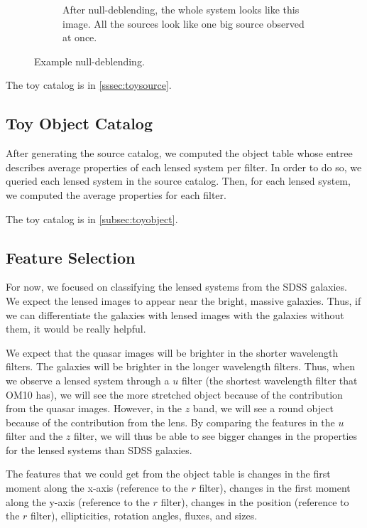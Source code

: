 \documentclass[\docopts]{\docclass}
\begin{document}
\begin{figure}
\begin{subfigure}[bt]{0.48\linewidth}
        \caption{After null-deblending, the whole system looks like this image. All the sources look like one big source observed at once.                                                                                                                                                                                 }
    \end{subfigure}
    \caption{Example null-deblending.}
    \label{fig:null-deblend}
\end{figure}

The toy catalog is in \ref{sssec:toysource}.

\subsection{Toy Object Catalog}
\label{sssec:toyobject}

After generating the source catalog, we computed the object table whose entree describes average properties of each lensed system per filter. In order to do so, we queried each lensed system in the source catalog. Then, for each lensed system, we computed the average properties for each filter.

The toy catalog is in \ref{subsec:toyobject}.

\subsection{Feature Selection}
\label{subsec:feature}

For now, we focused on classifying the lensed systems from the SDSS galaxies. We expect the lensed images to appear near the bright, massive galaxies. Thus, if we can differentiate the galaxies with lensed images with the galaxies without them, it would be really helpful.

We expect that the quasar images will be brighter in the shorter wavelength filters. The galaxies will be brighter in the longer wavelength filters. Thus, when we observe a lensed system through a $u$ filter (the shortest wavelength filter that OM10 has), we will see the more stretched object because of the contribution from the quasar images. However, in the $z$ band, we will see a round object because of the contribution from the lens. By comparing the features in the $u$ filter and the $z$ filter, we will thus be able to see bigger changes in the properties for the lensed systems than SDSS galaxies.

The features that we could get from the object table is changes in the first moment along the x-axis (reference to the $r$ filter), changes in the first moment along the y-axis (reference to the $r$ filter), changes in the position (reference to the $r$ filter), ellipticities, rotation angles, fluxes, and sizes.
\end{document}
